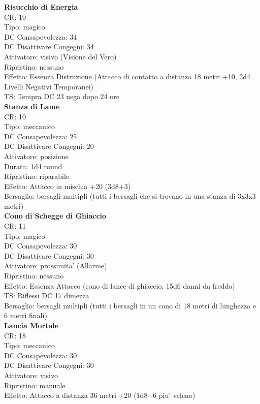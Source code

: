 \documentclass[a4paper,11pt,twoside,openany]{dndbook}
\begin{document}
\begin{multicols}{2}
\textbf{Risucchio di Energia}\\
CR: 10 \\
Tipo: magico \\
DC Consapevolezza: 34 \\
DC Disattivare Congegni: 34 \\
Attivatore: visivo (Visione del Vero) \\
Ripristino: nessuno \\
Effetto: Essenza Distruzione (Attacco di contatto a distanza 18 metri +10, 2d4 Livelli Negativi Temporanei) \\
TS: Tempra DC 23 nega dopo 24 ore\\

\textbf{Stanza di Lame}\\
CR: 10 \\
Tipo: meccanico \\
DC Consapevolezza: 25 \\
DC Disattivare Congegni: 20 \\
Attivatore: posizione \\
Durata: 1d4 round \\
Ripristino: riparabile \\
Effetto: Attacco in mischia +20 (3d8+3) \\
Bersaglio: bersagli multipli (tutti i bersagli che si trovano in una stanza di 3x3x3 metri)\\

\textbf{Cono di Schegge di Ghiaccio}\\
CR: 11 \\
Tipo: magico \\
DC Consapevolezza: 30 \\
DC Disattivare Congegni: 30 \\
Attivatore: prossimita' (Allarme) \\
Ripristino: nessuno \\
Effetto: Essenza Attacco (cono di lance di ghiaccio, 15d6 danni da freddo) \\
TS: Riflessi DC 17 dimezza \\
Bersaglio: bersagli multipli (tutti i bersagli in un cono di 18 metri di lunghezza e 6 metri finali)\\

\textbf{Lancia Mortale}\\
CR: 18 \\
Tipo: meccanico \\
DC Consapevolezza: 30 \\
DC Disattivare Congegni: 30 \\
Attivatore: visivo\\
Ripristino: manuale \\
Effetto: Attacco a distanza 36 metri +20 (1d8+6 piu' veleno)\\


\end{multicols}
\end{document}

